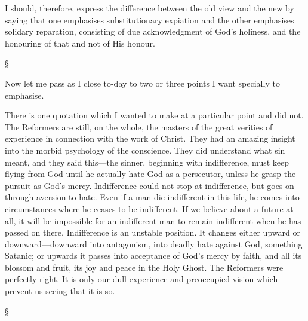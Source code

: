\documentclass[12pt,letterpaper,oneside]{book}
\begin{document}
I should, therefore, express the difference 
between the old view and the new by saying 
that one emphasises substitutionary expiation 
and the other emphasises solidary reparation, 
consisting of due acknowledgment of God's 
holiness, and the honouring of that and not of 
His honour. 

\begin{center}
\S
\end{center}

Now let me pass as I close to-day to two or 
three points I want specially to emphasise. 

There is one quotation which I wanted to 
make at a particular point and did not. The 
Reformers are still, on the whole, the masters of 
the great verities of experience in connection 
with the work of Christ. They had an amazing 
insight into the morbid psychology of the conscience. 
They did understand what sin meant, 
and they said this---the sinner, beginning with 
indifference, must keep flying from God until he 
actually hate God as a persecutor, unless he 
grasp the pursuit as God's mercy. Indifference 
could not stop at indifference, but goes on 
through aversion to hate. Even if a man die 
indifferent in this life, he comes into circumstances 
where he ceases to be indifferent. If we 
believe about a future at all, it will be impossible 
for an indifferent man to remain indifferent 
when he has passed on there. Indifference is 
an unstable position. It changes either upward 
or downward---downward into antagonism, into 
deadly hate against God, something Satanic; or 
upwards it passes into acceptance of God's mercy 
by faith, and all its blossom and fruit, its joy 
and peace in the Holy Ghost. The Reformers 
were perfectly right. It is only our dull experience 
and preoccupied vision which prevent 
us seeing that it is so. 

\begin{center}
\S
\end{center}
\end{document}
